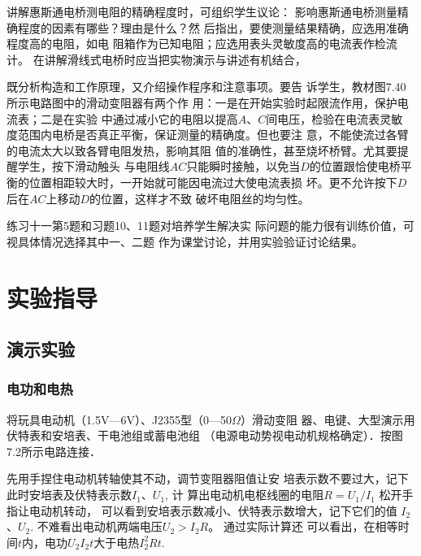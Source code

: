 讲解惠斯通电桥测电阻的精确程度时，可组织学生议论：
影响惠斯通电桥测量精确程度的因素有哪些？理由是什么？然
后指出，要使测量结果精确，应选用准确程度高的电阻，如电
阻箱作为已知电阻；应选用表头灵敏度高的电流表作检流计。
在讲解滑线式电桥时应当把实物演示与讲述有机结合，

既分析构造和工作原理，又介绍操作程序和注意事项。要告
诉学生，教材图7.40所示电路图中的滑动变阻器有两个作
用：一是在开始实验时起限流作用，保护电流表；二是在实验
中通过减小它的电阻以提高$A$、$C$间电压，检验在电流表灵敏
度范围内电桥是否真正平衡，保证测量的精确度。但也要注
意，不能使流过各臂的电流太大以致各臂电阻发热，影响其阻
值的准确性，甚至烧坏桥臂。尤其要提醒学生，按下滑动触头
与电阻线$AC$只能瞬时接触，以免当$D$的位置跟恰使电桥平
衡的位置相距较大时，一开始就可能因电流过大使电流表损
坏。更不允许按下$D$后在$AC$上移动$D$的位置，这样才不致
破坏电阻丝的均匀性。

练习十一第5题和习题10、11题对培养学生解决实
际问题的能力很有训练价值，可视具体情况选择其中一、二题
作为课堂讨论，并用实验验证讨论结果。


\section{实验指导}
\subsection{演示实验}
\subsubsection{电功和电热}
将玩具电动机（1.5V—6V）、J2355型（0—50$\Omega$）滑动变阻
器、电键、大型演示用伏特表和安培表、干电池组或蓄电池组
（电源电动势视电动机规格确定）．按图7.2所示电路连接．

先用手捏住电动机转轴使其不动，调节变阻器阻值让安
培表示数不要过大，记下此时安培表及伏特表示数$I_1$、$U_1$, 计
算出电动机电枢线圈的电阻$R=U_1/I_1$
松开手指让电动机转动，
可以看到安培表示数减小、伏特表示数增大，记下它们的值
$I_2$、$U_2$. 不难看出电动机两端电压$U_2>I_2R$。 通过实际计算还
可以看出，在相等时间$t$内，电功$U_2I_2t$大于电热$I_2^2Rt$.
\begin{figure}[htp]\centering
    \begin{minipage}[t]{0.48\textwidth}
    \centering
    \caption{}
    \end{minipage}
    \begin{minipage}[t]{0.48\textwidth}
    \centering
    \caption{}
    \end{minipage}
    \end{figure}

